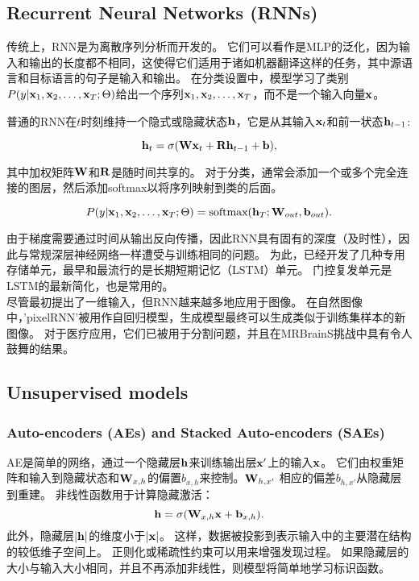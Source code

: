 \subsection{Recurrent Neural Networks (RNNs)}
\label{sec:rnns}
传统上，RNN是为离散序列分析而开发的。 它们可以看作是MLP的泛化，因为输入和输出的长度都不相同，这使得它们适用于诸如机器翻译这样的任务，其中源语言和目标语言的句子是输入和输出。 在分类设置中，模型学习了类别$P(y | {\bf x}_{1}, {\bf x}_{2}, \ldots, {\bf x}_{T}; \Theta)$给出一个序列${\bf x}_{1}, {\bf x}_{2}, \ldots, {\bf x}_{T}$，而不是一个输入向量${\bf x}$。

普通的RNN在$t$时刻维持一个隐式或隐藏状态${\bf h} $，它是从其输入${\bf x}_{t}$和前一状态${\bf h}_{t-1}$:

\begin{equation}
 {\bf h}_{t} = \sigma({\bf W}{\bf x}_{t} + {\bf R}{\bf h}_{t - 1} + {\bf b}),
\end{equation}

其中加权矩阵${\bf W}$和${\bf R}$是随时间共享的。 对于分类，通常会添加一个或多个完全连接的图层，然后添加softmax以将序列映射到类的后面。
 
\begin{equation}
 P(y | {\bf x}_{1}, {\bf x}_{2}, \ldots, {\bf x}_{T}; \Theta) = \text{softmax}( {\bf h}_{T}; {\bf W}_{out}, {\bf b}_{out}).
\end{equation}

由于梯度需要通过时间从输出反向传播，因此RNN具有固有的深度（及时性），因此与常规深层神经网络\citep{Beng94}一样遭受与训练相同的问题。 为此，已经开发了几种专用存储单元，最早和最流行的是长期短期记忆（LSTM）单元\citep{Hoch97}。 门控复发单元\citep{Cho14}是LSTM的最新简化，也是常用的。\\

尽管最初提出了一维输入，但RNN越来越多地应用于图像。 在自然图像中，'pixelRNN'被用作自回归模型，生成模型最终可以生成类似于训练集样本的新图像。 对于医疗应用，它们已被用于分割问题，并且在MRBrainS挑战中具有令人鼓舞的结果\citep{Stol15}。

\subsection{Unsupervised models}
\subsubsection{Auto-encoders (AEs) and Stacked Auto-encoders (SAEs)}
AE是简单的网络，通过一个隐藏层${\bf h}$来训练输出层${\bf x}'$上的输入${\bf x}$。 它们由权重矩阵和输入到隐藏状态和${\bf W}_{x, h}$的偏置$b_{x, h}$来控制。${\bf W}_{h, x'}$ 相应的偏差$b_{h, x'}$从隐藏层到重建。 非线性函数用于计算隐藏激活： 
\begin{equation}
\label{eq::ae_projection}
 {\bf h} = \sigma({\bf W}_{x, h} {\bf x} + {\bf b}_{x, h}).
\end{equation}
此外，隐藏层$|{\bf h}|$的维度小于$|{\bf x}|$。 这样，数据被投影到表示输入中的主要潜在结构的较低维子空间上。 正则化或稀疏性约束可以用来增强发现过程。 如果隐藏层的大小与输入大小相同，并且不再添加非线性，则模型将简单地学习标识函数。

